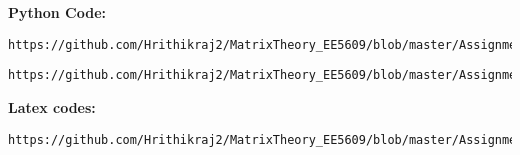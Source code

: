 \documentclass[journal,12pt,twocolumn]{IEEEtran}
\begin{document}
\textbf{Python Code:}
\begin{lstlisting}
https://github.com/Hrithikraj2/MatrixTheory_EE5609/blob/master/Assignment_1/codes/A1_code1.py
\end{lstlisting}
\begin{lstlisting}
https://github.com/Hrithikraj2/MatrixTheory_EE5609/blob/master/Assignment_1/codes/A1_code4.py
\end{lstlisting}
\textbf{Latex codes:}
\begin{lstlisting}
https://github.com/Hrithikraj2/MatrixTheory_EE5609/blob/master/Assignment_1/latex/A1.tex
\end{lstlisting}
\end{document}
